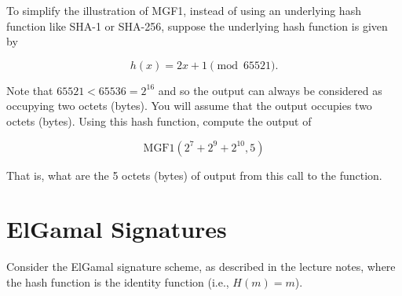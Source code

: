 \documentclass[12pt, letterpaper]{article}
\begin{document}
\medskip
To simplify the illustration of MGF1, instead of using an underlying hash function like SHA-1 or SHA-256, suppose the underlying hash function is given by

\[ h(x) = 2x + 1  \pmod {65521}. \] 

Note that $65521 < 65536 = 2^{16}$ and so the output can always be considered as occupying two octets (bytes). You will assume that the output occupies two octets (bytes). Using this hash function, compute the output of 

\[  \textrm{MGF1}(2^7+2^9+2^{10}, 5) \]

That is, what are the 5 octets (bytes) of output from this call to the function. 

\newpage

\section{ElGamal Signatures}

Consider the ElGamal signature scheme, as described in the 
lecture notes, where the hash function is the identity 
function (i.e., $H(m) = m$).
\end{document}
